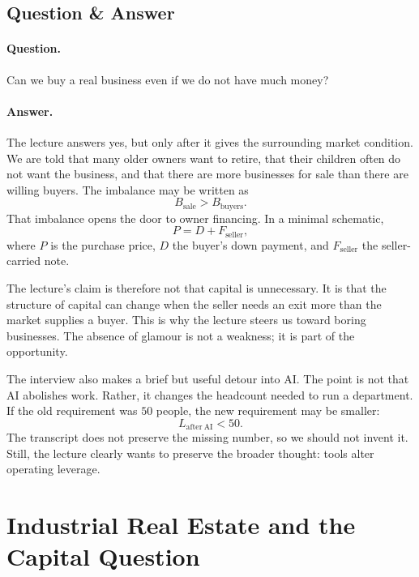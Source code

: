 \subsection{Question \& Answer}

\paragraph{Question.} Can we buy a real business even if we do not have much money?

\paragraph{Answer.} The lecture answers yes, but only after it gives the surrounding market condition. We are told that many older owners want to retire, that their children often do not want the business, and that there are more businesses for sale than there are willing buyers. The imbalance may be written as
\begin{equation}
B_{\mathrm{sale}} > B_{\mathrm{buyers}}.
\end{equation}
That imbalance opens the door to owner financing. In a minimal schematic,
\begin{equation}
P = D + F_{\mathrm{seller}},
\end{equation}
where \(P\) is the purchase price, \(D\) the buyer's down payment, and \(F_{\mathrm{seller}}\) the seller-carried note.

The lecture's claim is therefore not that capital is unnecessary. It is that the structure of capital can change when the seller needs an exit more than the market supplies a buyer. This is why the lecture steers us toward boring businesses. The absence of glamour is not a weakness; it is part of the opportunity.

The interview also makes a brief but useful detour into AI. The point is not that AI abolishes work. Rather, it changes the headcount needed to run a department. If the old requirement was \(50\) people, the new requirement may be smaller:
\begin{equation}
L_{\mathrm{after\ AI}} < 50.
\end{equation}
The transcript does not preserve the missing number, so we should not invent it. Still, the lecture clearly wants to preserve the broader thought: tools alter operating leverage.

\section{Industrial Real Estate and the Capital Question}

